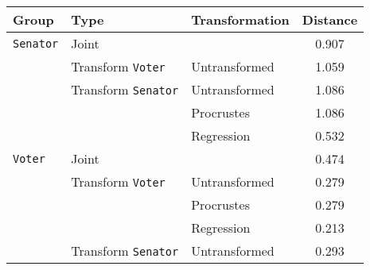 \begin{tabular}{lllc}
  \toprule
Group & Type & Transformation & Distance \\ 
  \midrule
\texttt{Senator} & Joint &  & 0.907 \\ 
   & Transform \texttt{Voter} & Untransformed & 1.059 \\ 
   & Transform \texttt{Senator} & Untransformed & 1.086 \\ 
   &  & Procrustes & 1.086 \\ 
   &  & Regression & 0.532 \\ 
   \midrule
\texttt{Voter} & Joint &  & 0.474 \\ 
   & Transform \texttt{Voter} & Untransformed & 0.279 \\ 
   &  & Procrustes & 0.279 \\ 
   &  & Regression & 0.213 \\ 
   & Transform \texttt{Senator} & Untransformed & 0.293 \\ 
   \bottomrule
\end{tabular}
